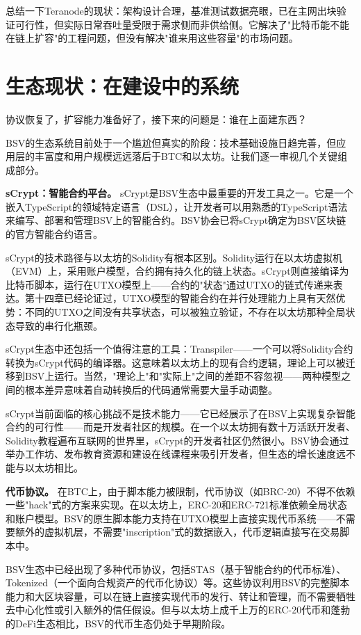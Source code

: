 \documentclass[a4paper,12pt,openany]{ctexbook}
\begin{document}
总结一下Teranode的现状：架构设计合理，基准测试数据亮眼，已在主网出块验证可行性，但实际日常吞吐量受限于需求侧而非供给侧。它解决了"比特币能不能在链上扩容"的工程问题，但没有解决"谁来用这些容量"的市场问题。


\section*{生态现状：在建设中的系统}


协议恢复了，扩容能力准备好了，接下来的问题是：谁在上面建东西？

BSV的生态系统目前处于一个尴尬但真实的阶段：技术基础设施日趋完善，但应用层的丰富度和用户规模远远落后于BTC和以太坊。让我们逐一审视几个关键组成部分。

\textbf{sCrypt：智能合约平台。} sCrypt是BSV生态中最重要的开发工具之一。它是一个嵌入TypeScript的领域特定语言（DSL），让开发者可以用熟悉的TypeScript语法来编写、部署和管理BSV上的智能合约。BSV协会已将sCrypt确定为BSV区块链的官方智能合约语言。

sCrypt的技术路径与以太坊的Solidity有根本区别。Solidity运行在以太坊虚拟机（EVM）上，采用账户模型，合约拥有持久化的链上状态。sCrypt则直接编译为比特币脚本，运行在UTXO模型上——合约的"状态"通过UTXO的链式传递来表达。第十四章已经论证过，UTXO模型的智能合约在并行处理能力上具有天然优势：不同的UTXO之间没有共享状态，可以被独立验证，不存在以太坊那种全局状态导致的串行化瓶颈。

sCrypt生态中还包括一个值得注意的工具：Transpiler——一个可以将Solidity合约转换为sCrypt代码的编译器。这意味着以太坊上的现有合约逻辑，理论上可以被迁移到BSV上运行。当然，"理论上"和"实际上"之间的差距不容忽视——两种模型之间的根本差异意味着自动转换后的代码通常需要大量手动调整。

sCrypt当前面临的核心挑战不是技术能力——它已经展示了在BSV上实现复杂智能合约的可行性——而是开发者社区的规模。在一个以太坊拥有数十万活跃开发者、Solidity教程遍布互联网的世界里，sCrypt的开发者社区仍然很小。BSV协会通过举办工作坊、发布教育资源和建设在线课程来吸引开发者，但生态的增长速度远不能与以太坊相比。

\textbf{代币协议。} 在BTC上，由于脚本能力被限制，代币协议（如BRC-20）不得不依赖一些"hack"式的方案来实现。在以太坊上，ERC-20和ERC-721标准依赖全局状态和账户模型。BSV的原生脚本能力支持在UTXO模型上直接实现代币系统——不需要额外的虚拟机层，不需要"inscription"式的数据嵌入，代币逻辑直接写在交易脚本中。

BSV生态中已经出现了多种代币协议，包括STAS（基于智能合约的代币标准）、Tokenized（一个面向合规资产的代币化协议）等。这些协议利用BSV的完整脚本能力和大区块容量，可以在链上直接实现代币的发行、转让和管理，而不需要牺牲去中心化性或引入额外的信任假设。但与以太坊上成千上万的ERC-20代币和蓬勃的DeFi生态相比，BSV的代币生态仍处于早期阶段。
\end{document}
